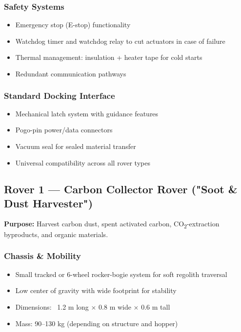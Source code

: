\documentclass[12pt, a4paper]{article}
\begin{document}
\subsubsection{Safety Systems}
\begin{itemize}
    \item Emergency stop (E-stop) functionality
    \item Watchdog timer and watchdog relay to cut actuators in case of failure
    \item Thermal management: insulation + heater tape for cold starts
    \item Redundant communication pathways
\end{itemize}

\subsubsection{Standard Docking Interface}
\begin{itemize}
    \item Mechanical latch system with guidance features
    \item Pogo-pin power/data connectors
    \item Vacuum seal for sealed material transfer
    \item Universal compatibility across all rover types
\end{itemize}

\subsection{Rover 1 — Carbon Collector Rover ("Soot \& Dust Harvester")}

\textbf{Purpose:} Harvest carbon dust, spent activated carbon, CO\textsubscript{2}-extraction byproducts, and organic materials.

\subsubsection{Chassis \& Mobility}
\begin{itemize}
    \item Small tracked or 6-wheel rocker-bogie system for soft regolith traversal
    \item Low center of gravity with wide footprint for stability
    \item Dimensions: ~1.2 m long × 0.8 m wide × 0.6 m tall
    \item Mass: 90–130 kg (depending on structure and hopper)
\end{itemize}
\end{document}
